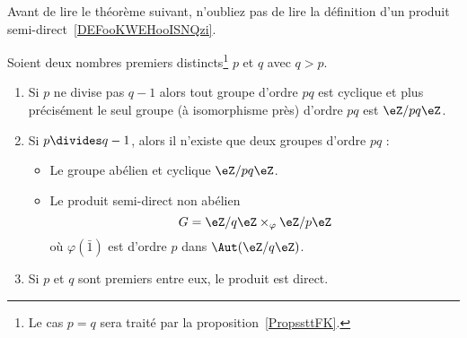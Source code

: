 Avant de lire le théorème suivant, n'oubliez pas de lire la définition d'un produit semi-direct~\ref{DEFooKWEHooISNQzi}.
\begin{theorem} \label{ThoLnTMBy}
	Soient deux nombres premiers distincts\footnote{Le cas \( p=q\) sera traité par la proposition~\ref{PropssttFK}.} \( p\) et \( q\) avec \( q>p\).
	\begin{enumerate}
		\item
		      Si \( p\) ne divise pas \( q-1\) alors tout groupe d'ordre \( pq\) est cyclique et plus précisément le seul groupe (à isomorphisme près) d'ordre \( pq\) est \( \eZ/pq\eZ\).
		\item       \label{ITEMooFQXIooFLAiUD}
		      Si \( p\divides q-1\), alors il n'existe que deux groupes d'ordre \( pq\) :
		      \begin{itemize}
			      \item Le groupe abélien et cyclique \( \eZ/pq\eZ\).
			      \item Le produit semi-direct non abélien
			            \begin{equation}    \label{EqNuuTRE}
				            G=\eZ/q\eZ\times_{\varphi}\eZ/p\eZ
			            \end{equation}
			            où \( \varphi(\bar 1)\) est d'ordre \( p\) dans \( \Aut(\eZ/q\eZ)\).
		      \end{itemize}

		\item

		      Si \( p\) et \( q\) sont premiers entre eux, le produit est direct.
	\end{enumerate}
\end{theorem}

